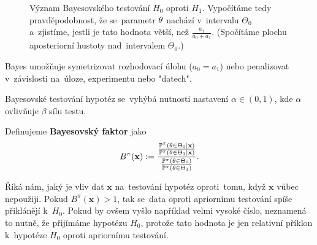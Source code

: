 \begin{figure}[h]
\centering
\caption{Význam Bayesovského testování $H_0$ oproti $H_1$. Vypočítáme tedy pravděpodobnost, že se~parametr $\theta$ nachází v~intervalu $\Theta_0$ a~zjistíme, jestli je tato hodnota větší, než $\frac{a_1}{a_0+a_1}$. (Spočítáme plochu aposteriorní hustoty nad~intervalem $\Theta_0$.)}
\label{fig:last0x}
\end{figure}
\begin{remark}
	Bayes umožňuje symetrizovat rozhodovací úlohu ($a_0=a_1$) nebo penalizovat v~závislosti na~úloze, experimentu nebo "datech".
	
	Bayesovské testování hypotéz se~vyhýbá nutnosti nastavení $\alpha\in(0,1)$, kde $\alpha$ ovlivňuje $\beta$ sílu testu.
\end{remark}
\begin{define}
	Definujeme \textbf{Bayesovský faktor} jako$$ B^\pi(\textbf{x}):=\frac{\frac{\mathbb{P}^\pi(\theta\in\Theta_0|\textbf{x})}{\mathbb{P}^\pi(\theta\in\Theta_1|\textbf{x})}}{\frac{\mathbb{P}^\pi(\theta\in\Theta_0)}{\mathbb{P}^\pi(\theta\in\Theta_1)}}.$$
\end{define}
\begin{remark}
		Říká nám, jaký je vliv dat $\textbf{x}$ na~testování hypotéz oproti~tomu, když $\textbf{x}$ vůbec nepoužiji. Pokud $B^\pi(\textbf{x})>1$, tak se~data oproti apriornímu testování spíše přiklánějí k~$H_0$. Pokud by ovšem vyšlo například velmi vysoké číslo, neznamená to nutně, že přijímáme hypotézu $H_0$, protože tato hodnota je jen relativní příklon k~hypotéze $H_0$ oproti apriornímu testování.
\end{remark}
